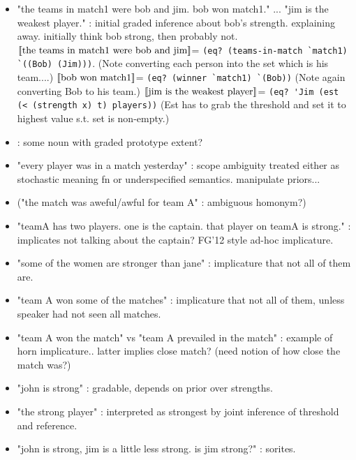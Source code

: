 \documentclass[12pt]{article}
\newcommand{\llbracket}{\ensuremath{\left [\!\left [}}%
\newcommand{\rrbracket}{\ensuremath{\right ]\!\right ]}}
\providecommand{\textsv}[1]{\ensuremath{\llbracket \text{#1} \rrbracket}}
\begin{document}
\begin{itemize}
\item "the teams in match1 were bob and jim. bob won match1." ... "jim is the weakest player." : initial graded inference about bob's strength. explaining away. initially think bob strong, then probably not.
\subitem \textsv{the teams in match1 were bob and jim}= \lstinline{(eq? (teams-in-match `match1) `((Bob) (Jim)))}. (Note converting each person into the set which is his team....)
\subitem \textsv{bob won match1}= \lstinline{(eq? (winner `match1) `(Bob))} (Note again converting Bob to his team.)
\subitem \textsv{jim is the weakest player}= \lstinline{(eq? 'Jim (est (< (strength x) t) players))}  (Est has to grab the threshold and set it to highest value s.t. set is non-empty.) 


\item : some noun with graded  prototype extent?
\item "every player was in a match yesterday" : scope ambiguity treated either as stochastic meaning fn or underspecified semantics. manipulate priors...
\item ("the match was aweful/awful for team A" : ambiguous homonym?)
\item "teamA has two players. one is the captain. that player on teamA is strong." : implicates not talking about the captain?  FG'12 style ad-hoc implicature.
\item "some of the women are stronger than jane" : implicature that not all of them are.
\item "team A won some of the matches" : implicature that not all of them, unless speaker had not seen all matches.
\item "team A won the match" vs "team A prevailed in the match" : example of horn implicature.. latter implies close match? (need notion of how close the match was?)
\item "john is strong" : gradable, depends on prior over strengths.
\item "the strong player" : interpreted as strongest by joint inference of threshold and reference.
\item "john is strong, jim is a little less strong. is jim strong?" : sorites.
\end{itemize}
\end{document}
